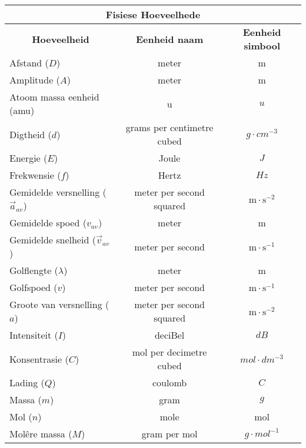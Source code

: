 \small{
\begin{table}[H]
\begin{center}
\begin{tabular}{|l|c|c|}\hline \hline 
\multicolumn{3}{|c|}{\textbf{Fisiese Hoeveelhede}}\\ \hline \hline
\multicolumn{1}{|c|}{\textbf{Hoeveelheid}} & \textbf{Eenheid naam} & \textbf{Eenheid simbool}\\ \hline
Afstand ($D$)             & meter & m                               \\ \hline
Amplitude ($A$)             & meter & m                              \\ \hline
Atoom massa eenheid (amu)               & u & $u$  \\ \hline
Digtheid ($d$)                & grams per centimetre cubed & $g \cdot cm^{-3}$           \\ \hline
Energie ($E$)             & Joule & $J$ \\ \hline
Frekwensie ($f$)             & Hertz &  $Hz$   \\ \hline
Gemidelde versnelling ($\vec{a}_{av}$)  & meter per second squared & $\text{m} \cdot \text{s}^{-2}$  \\ \hline
Gemidelde spoed ($v_{av}$)        & meter & m                               \\ \hline
Gemidelde snelheid ($\vec{v}_{av}$)  & meter per second & $\text{m} \cdot \text{s}^{-1}$  \\ \hline
Golflengte ($\lambda$)       & meter & m                                \\ \hline
Golfspoed ($v$)             & meter per second & $\text{m} \cdot \text{s}^{-1}$ \\ \hline
Groote van versnelling ($a$)   & meter per second squared & $\text{m} \cdot \text{s}^{-2}$  \\ \hline
Intensiteit ($I$)            & deciBel &   $dB$                         \\ \hline
Konsentrasie ($C$)             & mol per decimetre cubed & $mol \cdot dm^{-3}$  \\ \hline
Lading ($Q$)             & coulomb                   &  $C$                \\ \hline
Massa ($m$)             & gram & $g$\\ \hline
Mol ($n$)             & mole & mol     \\ \hline
Mol\^{e}re massa ($M$)             & gram per mol & $g \cdot mol^{-1}$              \\ \hline

\end{tabular}
\end{center}
\end{table}}
